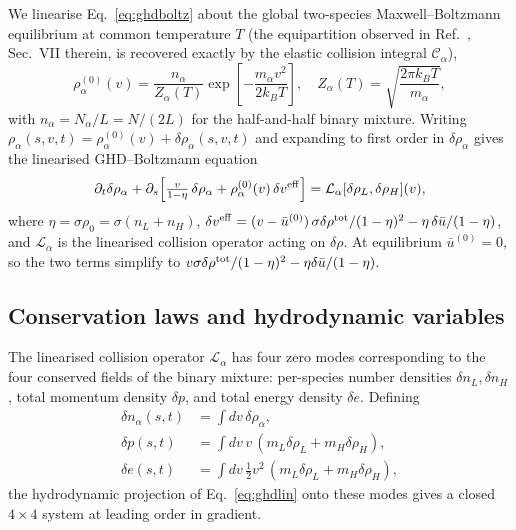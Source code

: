 \documentclass[aps,pre,twocolumn,superscriptaddress,longbibliography,floatfix]{revtex4-2}
\begin{document}
We linearise Eq.~\eqref{eq:ghdboltz} about the global
two-species Maxwell--Boltzmann equilibrium at common
temperature $T$ (the equipartition observed in
Ref.~\cite{PaperIII}, Sec.~VII therein, is recovered exactly
by the elastic collision integral $\mathcal{C}_\alpha$),
\begin{equation}
\rho_\alpha^{(0)}(v) = \frac{n_\alpha}{Z_\alpha(T)}
  \exp\!\left[-\frac{m_\alpha v^2}{2 k_B T}\right],\quad
Z_\alpha(T) = \sqrt{\frac{2\pi k_BT}{m_\alpha}},
\label{eq:rhoeq}
\end{equation}
with $n_\alpha = N_\alpha/L = N/(2L)$ for the half-and-half
binary mixture. Writing
$\rho_\alpha(s,v,t) = \rho_\alpha^{(0)}(v) + \delta\rho_\alpha(s,v,t)$
and expanding to first order in $\delta\rho_\alpha$ gives the
linearised GHD--Boltzmann equation
\begin{equation}
\partial_t \delta\rho_\alpha
+ \partial_s\!\left[\tfrac{v}{1-\eta}\,\delta\rho_\alpha
                 + \rho_\alpha^{(0)}(v)\,\delta v^{\rm eff}\right]
= \mathcal{L}_\alpha[\delta\rho_L,\delta\rho_H](v),
\label{eq:ghdlin}
\end{equation}
where $\eta = \sigma\rho_0 = \sigma(n_L+n_H)$,
$\delta v^{\rm eff} = (v - \bar u^{(0)})\,\sigma\delta\rho^{\rm tot}/(1-\eta)^2
- \eta\,\delta\bar u/(1-\eta)$, and
$\mathcal{L}_\alpha$ is the linearised collision operator
acting on $\delta\rho$. At equilibrium $\bar u^{(0)}=0$, so the
two terms simplify to $v\sigma\delta\rho^{\rm tot}/(1-\eta)^2
- \eta\delta\bar u/(1-\eta)$.

\subsection{Conservation laws and hydrodynamic variables}

The linearised collision operator $\mathcal{L}_\alpha$ has four
zero modes corresponding to the four conserved fields of the
binary mixture: per-species number densities $\delta n_L,
\delta n_H$, total momentum density $\delta p$, and total
energy density $\delta e$. Defining
\begin{align}
\delta n_\alpha(s,t) &= \int\!dv\,\delta\rho_\alpha,\\
\delta p(s,t) &= \int\!dv\,v\,(m_L\delta\rho_L + m_H\delta\rho_H),\\
\delta e(s,t) &= \int\!dv\,\tfrac12 v^2\,(m_L\delta\rho_L + m_H\delta\rho_H),
\end{align}
the hydrodynamic projection of Eq.~\eqref{eq:ghdlin} onto these
modes gives a closed $4\!\times\!4$ system at leading order in
gradient.
\end{document}
